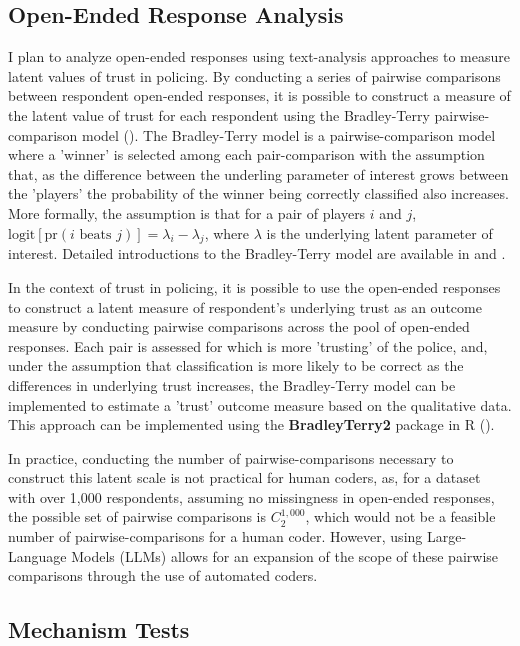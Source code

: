 \documentclass[12pt]{article}
\begin{document}
\subsection{Open-Ended Response Analysis}

I plan to analyze open-ended responses using text-analysis approaches to measure latent values of trust in policing. By conducting a series of pairwise comparisons between respondent open-ended responses, it is possible to construct a measure of the latent value of trust for each respondent using the Bradley-Terry pairwise-comparison model (\cite{bradley1952rank}). The Bradley-Terry model is a pairwise-comparison model where a 'winner' is selected among each pair-comparison with the assumption that, as the difference between the underling parameter of interest grows between the 'players' the probability of the winner being correctly classified also increases. More formally, the assumption is that for a pair of players $i$ and $j$, $\text{logit}[\text{pr}(i \text{ beats } j)] = \lambda_i - \lambda_j$, where $\lambda$ is the underlying latent parameter of interest. Detailed introductions to the Bradley-Terry model are available in \cite{bradley198414} and \cite{agresti2013categorical}.

In the context of trust in policing, it is possible to use the open-ended responses to construct a latent measure of respondent's underlying trust as an outcome measure by conducting pairwise comparisons across the pool of open-ended responses. Each pair is assessed for which is more 'trusting' of the police, and, under the assumption that classification is more likely to be correct as the differences in underlying trust increases, the Bradley-Terry model can be implemented to estimate a 'trust' outcome measure based on the qualitative data. This approach can be implemented using the \textbf{BradleyTerry2} package in R (\cite{turner2012bradley}).

In practice, conducting the number of pairwise-comparisons necessary to construct this latent scale is not practical for human coders, as, for a dataset with over 1,000 respondents, assuming no missingness in open-ended responses, the possible set of pairwise comparisons is $C^{1,000}_2$, which would not be a feasible number of pairwise-comparisons for a human coder. However, using Large-Language Models (LLMs) allows for an expansion of the scope of these pairwise comparisons through the use of automated coders.

\subsection{Mechanism Tests}
\end{document}
